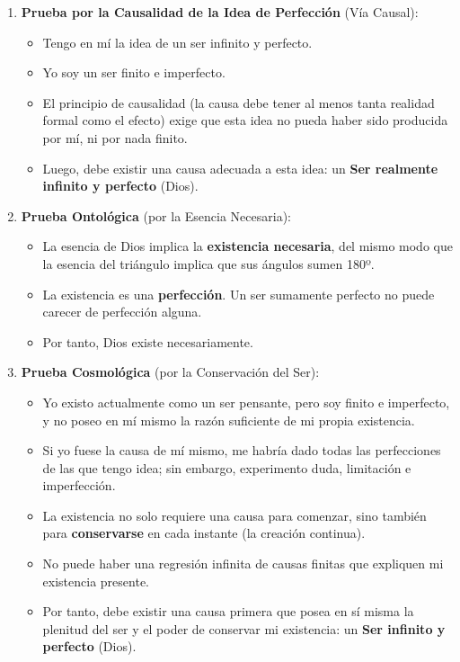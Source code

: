 \documentclass[10pt]{article}
\begin{document}
\begin{enumerate}
  \item \textbf{Prueba por la Causalidad de la Idea de Perfección} (Vía Causal):
    \begin{itemize}
      \item Tengo en mí la idea de un ser infinito y perfecto.
      \item Yo soy un ser finito e imperfecto.
      \item El principio de causalidad (la causa debe tener al menos tanta realidad formal como el efecto) exige que esta idea no pueda haber sido producida 
        por mí, ni por nada finito.
      \item Luego, debe existir una causa adecuada a esta idea: un \textbf{Ser realmente infinito y perfecto} (Dios).
    \end{itemize}
  \item \textbf{Prueba Ontológica} (por la Esencia Necesaria):
    \begin{itemize}
      \item La esencia de Dios implica la \textbf{existencia necesaria}, del mismo modo que la esencia del triángulo implica que sus ángulos sumen 180º.
      \item La existencia es una \textbf{perfección}. Un ser sumamente perfecto no puede carecer de perfección alguna.
      \item Por tanto, Dios existe necesariamente.
    \end{itemize}
  \item \textbf{Prueba Cosmológica} (por la Conservación del Ser):
    \begin{itemize}
      \item Yo existo actualmente como un ser pensante, pero soy finito e imperfecto, y no poseo en mí mismo la razón suficiente de mi propia existencia.
      \item Si yo fuese la causa de mí mismo, me habría dado todas las perfecciones de las que tengo idea; sin embargo, experimento duda, limitación e imperfección.
      \item La existencia no solo requiere una causa para comenzar, sino también para \textbf{conservarse} en cada instante (la creación continua).
      \item No puede haber una regresión infinita de causas finitas que expliquen mi existencia presente.
      \item Por tanto, debe existir una causa primera que posea en sí misma la plenitud del ser y el poder de conservar mi existencia: un \textbf{Ser infinito y perfecto} (Dios).
    \end{itemize}
\end{enumerate}
\end{document}
